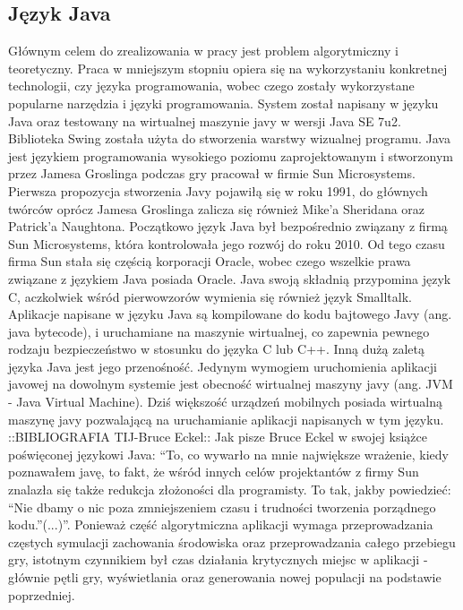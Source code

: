 \begin{par}
	\subsection{Język Java}
	Głównym celem do zrealizowania w pracy jest problem algorytmiczny i teoretyczny.
	Praca w mniejszym stopniu opiera się na wykorzystaniu konkretnej technologii, czy języka programowania, wobec czego zostały wykorzystane popularne narzędzia i języki programowania.
	System został napisany w języku Java oraz testowany na wirtualnej maszynie javy w wersji Java SE 7u2. Biblioteka Swing została użyta do stworzenia warstwy wizualnej programu.
	Java jest językiem programowania wysokiego poziomu zaprojektowanym i stworzonym przez Jamesa Groslinga podczas gry pracował w firmie Sun Microsystems. Pierwsza propozycja stworzenia Javy pojawiłą się w roku 1991, do głównych twórców oprócz Jamesa Groslinga zalicza się również Mike'a Sheridana oraz Patrick'a Naughtona.
	Początkowo język Java był bezpośrednio związany z firmą Sun Microsystems, która kontrolowała jego rozwój do roku 2010.
	Od tego czasu firma Sun stała się częścią korporacji Oracle, wobec czego wszelkie prawa związane z językiem Java posiada Oracle.
	Java swoją składnią przypomina język C, aczkolwiek wśród pierwowzorów wymienia się również język Smalltalk.
	Aplikacje napisane w języku Java są kompilowane do kodu bajtowego Javy (ang. java bytecode), i uruchamiane na maszynie wirtualnej, co zapewnia pewnego rodzaju bezpieczeństwo w stosunku do języka C lub C++.
	Inną dużą zaletą języka Java jest jego przenośność.
	Jedynym wymogiem uruchomienia aplikacji javowej na dowolnym systemie jest obecność wirtualnej maszyny javy (ang. JVM - Java Virtual Machine).
	Dziś większość urządzeń mobilnych posiada wirtualną maszynę javy pozwalającą na uruchamianie aplikacji napisanych w tym języku.
	::BIBLIOGRAFIA TIJ-Bruce Eckel::
	Jak pisze Bruce Eckel w swojej książce poświęconej językowi Java: ``To, co wywarło na mnie największe wrażenie, kiedy poznawałem javę, to fakt, że wśród innych celów projektantów z firmy Sun znalazła się także redukcja złożoności dla programisty. 
	To tak, jakby powiedzieć: ``Nie dbamy o nic poza zmniejszeniem czasu i trudności tworzenia porządnego kodu.''(...)''.
	Ponieważ część algorytmiczna aplikacji wymaga przeprowadzania częstych symulacji zachowania środowiska oraz przeprowadzania całego przebiegu gry, istotnym czynnikiem był czas działania krytycznych miejsc w aplikacji - głównie pętli gry, wyświetlania oraz generowania nowej populacji na podstawie poprzedniej.

\end{par}
